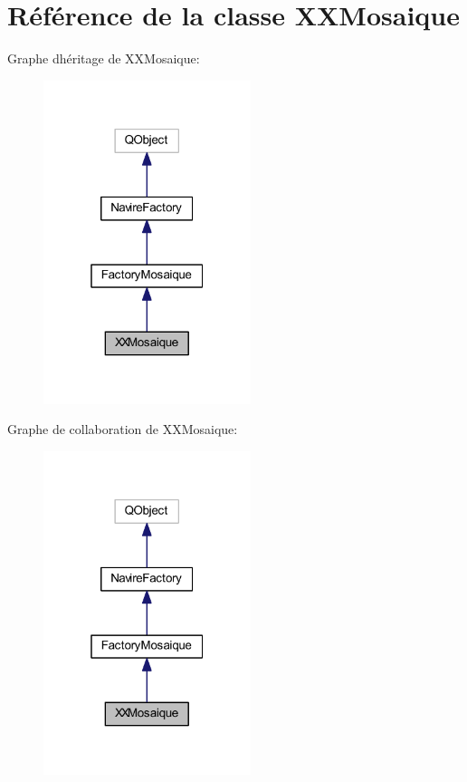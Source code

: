 \hypertarget{class_x_x_mosaique}{}\section{Référence de la classe X\+X\+Mosaique}
\label{class_x_x_mosaique}


Graphe d\textquotesingle{}héritage de X\+X\+Mosaique\+:
\nopagebreak
\begin{figure}[H]
\begin{center}
\leavevmode
\includegraphics[width=172pt]{class_x_x_mosaique__inherit__graph}
\end{center}
\end{figure}


Graphe de collaboration de X\+X\+Mosaique\+:
\nopagebreak
\begin{figure}[H]
\begin{center}
\leavevmode
\includegraphics[width=172pt]{class_x_x_mosaique__coll__graph}
\end{center}
\end{figure}
